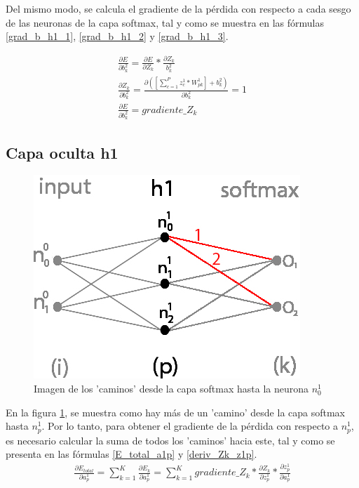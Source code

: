 Del mismo modo, se calcula el gradiente de la pérdida con respecto a cada sesgo de las neuronas de la capa softmax, tal y como se muestra en las fórmulas \ref{grad_b_h1_1}, \ref{grad_b_h1_2} y \ref{grad_b_h1_3}.

\begin{gather}
	\frac{\partial E}{\partial b^2_k} = \frac{\partial E}{\partial Z_k} * \frac{\partial Z_k}{b^2_k} \label{grad_b_h1_1} \\
	\frac{\partial Z_k }{\partial b^2_k } = \frac{\partial ([\sum_{c=1}^{P} z^1_c * W^1_{pk}] + b^2_k) }{\partial b^2_k } = 1 \label{grad_b_h1_2} \\
	\frac{\partial E}{\partial b^2_k} = gradiente\_Z_k \label{grad_b_h1_3}
\end{gather}

\subsection{Capa oculta h1}

\begin{figure}[H]
	\centering
	\includegraphics[scale=0.35]{imagenes/nn_caminos_posibles.jpg}  
	\caption{Imagen de los 'caminos' desde la capa softmax hasta la neurona $n^1_0$}
	\label{nn_caminos_posibles}
\end{figure}

En la figura \ref{nn_caminos_posibles}, se muestra como hay más de un 'camino' desde la capa softmax hasta $n^1_p$. Por lo tanto, para obtener el gradiente de la pérdida con respecto a $n^1_p$, es necesario calcular la suma de todos los 'caminos' hacia este, tal y como se presenta en las fórmulas \ref{E_total_a1p} y \ref{deriv_Zk_z1p}. \\

\begin{gather}
	\frac{\partial E_{total}}{\partial a^1_p} = \sum_{k=1}^K \frac{\partial E_k}{\partial a^1_p} = \sum_{k=1}^K  gradiente\_Z_k * \frac{\partial Z_k}{\partial z^1_p} * \frac{\partial z^1_p}{\partial a^1_p}
	\label{E_total_a1p}
\end{gather}

